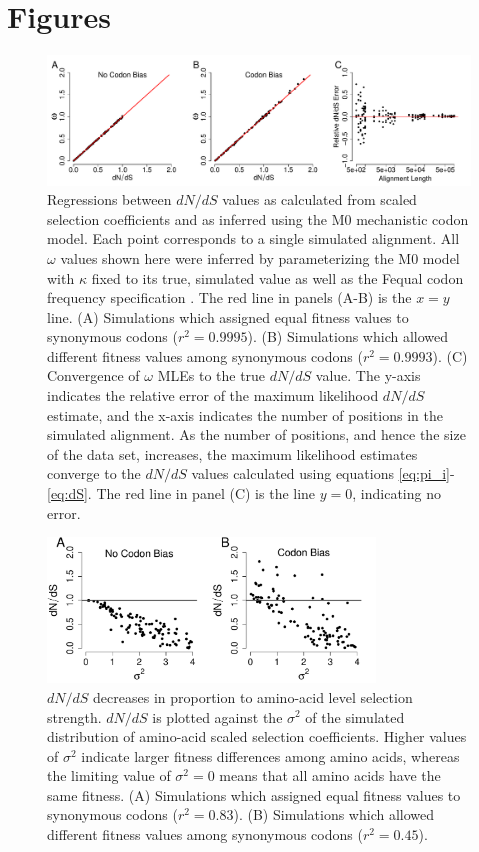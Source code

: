 \documentclass{pnastwo}
\begin{document}
\section*{Figures}

\begin{figure}[htbp]
\centerline{\includegraphics[width=18.7cm]{figures/MainText/regression_convergence.pdf}}
\caption{\label{reg_conv} Regressions between $dN/dS$ values as calculated from scaled selection coefficients and as inferred using the M0 mechanistic codon model. Each point corresponds to a single simulated alignment. All $\omega$ values shown here were inferred by parameterizing the M0 model with $\kappa$ fixed to its true, simulated value as well as the Fequal codon frequency specification \cite{Yang2006}. The red line in panels (A-B) is the $x=y$ line. (A) Simulations which assigned equal fitness values to synonymous codons ($r^2=0.9995$). (B) Simulations which allowed different fitness values among synonymous codons ($r^2=0.9993$). (C) Convergence of $\omega$ MLEs to the true $dN/dS$ value. The y-axis indicates the relative error of the maximum likelihood $dN/dS$ estimate, and the x-axis indicates the number of positions in the simulated alignment. As the number of positions, and hence the size of the data set, increases, the maximum likelihood estimates converge to the $dN/dS$ values calculated using equations \eqref{eq:pi_i}-\eqref{eq:dS}. The red line in panel (C) is the line $y=0$, indicating no error.}
\end{figure}


\bigskip
\bigskip
\bigskip
\bigskip

\begin{figure}[htbp]
\centerline{\includegraphics[width=8.7cm]{figures/MainText/sd_vs_dnds.pdf}}
\caption{\label{stddev_dnds} $dN/dS$ decreases in proportion to amino-acid level selection strength. $dN/dS$ is plotted against the $\sigma^2 $ of the simulated distribution of amino-acid scaled selection coefficients. Higher values of $\sigma^2$ indicate larger fitness differences among amino acids, whereas the limiting value of $\sigma^2 = 0$ means that all amino acids have the same fitness. (A) Simulations which assigned equal fitness values to synonymous codons ($r^2=0.83$). (B) Simulations which allowed different fitness values among synonymous codons ($r^2=0.45$).}
\end{figure}
\end{document}
